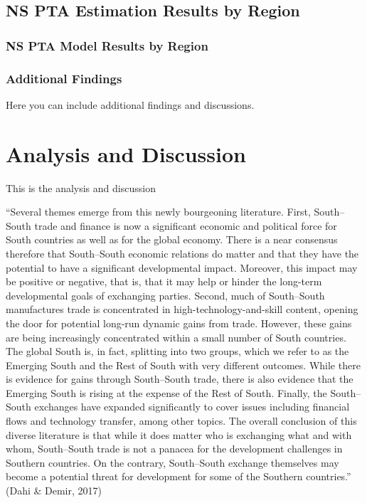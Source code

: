 \documentclass[12pt]{article}%
\begin{document}
%
\subsection{NS PTA Estimation Results by Region}%
\label{subsec:NSPTAEstimationResultsbyRegion}%
\subsubsection{NS PTA Model Results by Region}%
\label{ssubsec:NSPTAModelResultsbyRegion}%
%
%
%
%


%
\newpage%
\subsubsection{Additional Findings}%
\label{ssubsec:AdditionalFindings}%
Here you can include additional findings and discussions.

%
\section{Analysis and Discussion}%
\label{sec:AnalysisandDiscussion}%
This is the analysis and discussion

``Several themes emerge from this newly bourgeoning literature. First,
South--South trade and finance is now a significant economic and
political force for South countries as well as for the global economy.
There is a near consensus therefore that South--South economic relations
do matter and that they have the potential to have a significant
developmental impact. Moreover, this impact may be positive or negative,
that is, that it may help or hinder the long-term developmental goals of
exchanging parties. Second, much of South--South manufactures trade is
concentrated in high-technology-and-skill content, opening the door for
potential long-run dynamic gains from trade. However, these gains are
being increasingly concentrated within a small number of South
countries. The global South is, in fact, splitting into two groups,
which we refer to as the Emerging South and the Rest of South with very
different outcomes. While there is evidence for gains through
South--South trade, there is also evidence that the Emerging South is
rising at the expense of the Rest of South. Finally, the South--South
exchanges have expanded significantly to cover issues including
financial flows and technology transfer, among other topics. The overall
conclusion of this diverse literature is that while it does matter who
is exchanging what and with whom, South--South trade is not a panacea
for the development challenges in Southern countries. On the contrary,
South--South exchange themselves may become a potential threat for
development for some of the Southern countries.'' (Dahi \& Demir, 2017)
\end{document}
